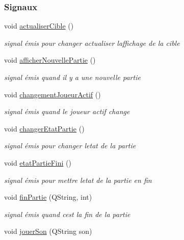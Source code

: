 \subsubsection*{Signaux}
\begin{DoxyCompactItemize}
\item 
void \hyperlink{class_darts_afcf6c21d8489e9cf1734458a23b518eb}{actualiser\+Cible} ()
\begin{DoxyCompactList}\small\item\em signal émis pour changer actualiser l\textquotesingle{}affichage de la cible \end{DoxyCompactList}\item 
void \hyperlink{class_darts_a650d6efdef25756bfbbacb0bb3549c43}{afficher\+Nouvelle\+Partie} ()
\begin{DoxyCompactList}\small\item\em signal émis quand il y a une nouvelle partie \end{DoxyCompactList}\item 
void \hyperlink{class_darts_afeba952f29a901b4ebac86cfc7a4733f}{changement\+Joueur\+Actif} ()
\begin{DoxyCompactList}\small\item\em signal émis quand le joueur actif change \end{DoxyCompactList}\item 
void \hyperlink{class_darts_a25cf64530c84d7aa261a4806e88dcd6e}{changer\+Etat\+Partie} ()
\begin{DoxyCompactList}\small\item\em signal émis pour changer l\textquotesingle{}etat de la partie \end{DoxyCompactList}\item 
void \hyperlink{class_darts_a04a60e25e4c6a608a15c6abce35c9dfa}{etat\+Partie\+Fini} ()
\begin{DoxyCompactList}\small\item\em signal émis pour mettre l\textquotesingle{}etat de la partie en fin \end{DoxyCompactList}\item 
void \hyperlink{class_darts_a751870924fe01a94fbf49ce45451a218}{fin\+Partie} (Q\+String, int)
\begin{DoxyCompactList}\small\item\em signal émis quand c\textquotesingle{}est la fin de la partie \end{DoxyCompactList}\item 
void \hyperlink{class_darts_a87995841c66fc321b63c28fa8a786347}{jouer\+Son} (Q\+String son)

\end{DoxyCompactItemize}
